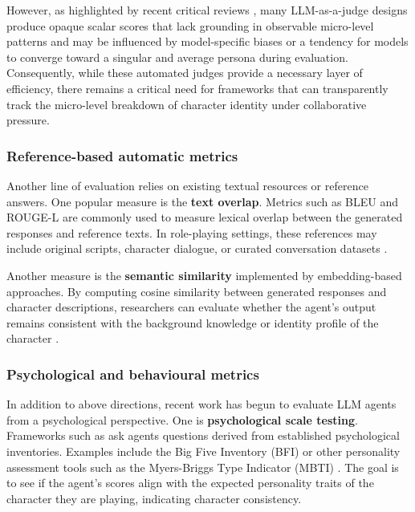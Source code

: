\documentclass{article}
\begin{document}
However, as highlighted by recent critical reviews \citep{chen2024review, guo2024review,samuel2024personagym, xi2025review}, many LLM-as-a-judge designs produce opaque scalar scores that lack grounding in observable micro-level patterns and may be influenced by model-specific biases or a tendency for models to converge toward a singular and average persona during evaluation. Consequently, while these automated judges provide a necessary layer of efficiency, there remains a critical need for frameworks that can transparently track the micro-level breakdown of character identity under collaborative pressure. 

\subsubsection{Reference-based automatic metrics} \label{sec:background_autometric}

Another line of evaluation relies on existing textual resources or reference answers. One popular measure is the \textbf{text overlap}. Metrics such as BLEU and ROUGE-L are commonly used to measure lexical overlap between the generated responses and reference texts. In role-playing settings, these references may include original scripts, character dialogue, or curated conversation datasets \citep{chen2023hp, wang2024rolellm, wang2024character100}.

Another measure is the \textbf{semantic similarity} implemented by embedding-based approaches. By computing cosine similarity between generated responses and character descriptions, researchers can evaluate whether the agent's output remains consistent with the background knowledge or identity profile of the character \citep{wang2024character100}. 

\subsubsection{Psychological and behavioural metrics} \label{sec:background_psychotest}

In addition to above directions, recent work has begun to evaluate LLM agents from a psychological perspective. One is \textbf{psychological scale testing}. Frameworks such as \citet{wang2024incharacter} ask agents questions derived from established psychological inventories. Examples include the Big Five Inventory (BFI) or other personality assessment tools such as the Myers-Briggs Type Indicator (MBTI) \citep{pan2023llms}.  The goal is to see if the agent's scores align with the expected personality traits of the character they are playing, indicating character consistency.
\end{document}
